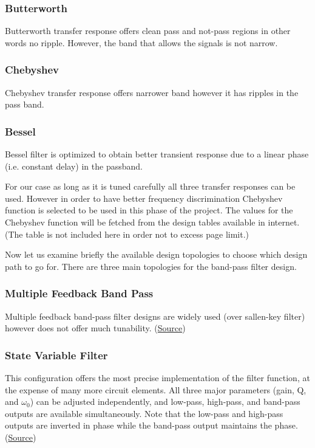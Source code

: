 \documentclass[letterpaper,12pt]{article}
\begin{document}
\subsubsection{Butterworth}
Butterworth transfer response offers clean pass and not-pass regions in other words no ripple. However, the band that allows the signals is not narrow.
\vspace{-4mm}
\subsubsection{Chebyshev}
Chebyshev transfer response offers narrower band however it has ripples in the pass band.
\subsubsection{Bessel}
Bessel filter is optimized to obtain better transient response due to a linear phase (i.e.
constant delay) in the passband.

\vspace{2mm}
For our case as long as it is tuned carefully all three transfer responses can be used. However in order to have  better frequency discrimination Chebyshev function is selected to be used in this phase of the project. The values for the Chebyshev function will be fetched from the design tables available in internet. (The table is not included here in order not to excess page limit.)

\vspace{2mm}
Now let us examine briefly the available design topologies to choose which design path to go for. There are three main topologies for the  band-pass filter design.
\vspace{-4mm}
\subsubsection{Multiple Feedback Band Pass}
Multiple feedback band-pass filter designs are widely used (over sallen-key filter) however does not offer much tunability. (\href{https://www.analog.com/media/en/training-seminars/tutorials/mt-220.pdf}{Source})
\vspace{-4mm}
\subsubsection{State Variable Filter}

This configuration offers the most precise implementation
of the filter function, at the expense of many more circuit
elements. All three major parameters (gain, Q, and \(\omega_0\)) can be adjusted independently, and low-pass, high-pass, and band-pass outputs are available simultaneously. Note that the low-pass and high-pass outputs are inverted in phase while the band-pass output maintains the phase. (\href{https://www.analog.com/media/en/training-seminars/tutorials/MT-223.pdf}{Source})
\vspace{-4mm}
\end{document}
